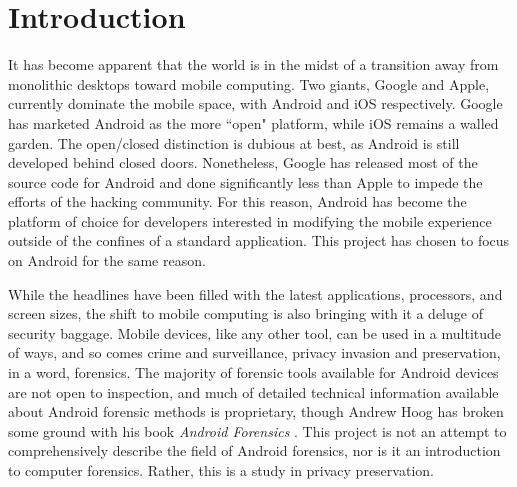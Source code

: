 \chapter{Introduction}
\label{ch:introduction}

It has become apparent that the world is in the midst of a transition away from monolithic desktops toward mobile computing.  Two
giants, Google and Apple, currently dominate the mobile space, with Android and iOS respectively.  Google has marketed Android as
the more ``open" platform, while iOS remains a walled garden.  The open/closed distinction is dubious at best, as Android is still
developed behind closed doors.  Nonetheless, Google has released most of the source code for Android and done significantly less
than Apple to impede the efforts of the hacking community. For this reason, Android has become the platform of choice for developers
interested in modifying the mobile experience outside of the confines of a standard application.  This project has chosen to focus
on Android for the same reason.

While the headlines have been filled with the latest applications, processors, and screen sizes, the shift to mobile computing is also
bringing with it a deluge of security baggage. Mobile devices, like any other tool, can be used in a multitude of ways, and so comes
crime and surveillance, privacy invasion and preservation, in a word, forensics. The majority of forensic tools available for Android
devices are not open to inspection, and much of detailed technical information available about Android forensic methods is
proprietary, though Andrew Hoog has broken some ground with his book \emph{Android Forensics} \cite{hoog}. This project is not an
attempt to comprehensively describe the field of Android forensics, nor is it an introduction to computer forensics. Rather, this is
a study in privacy preservation.

